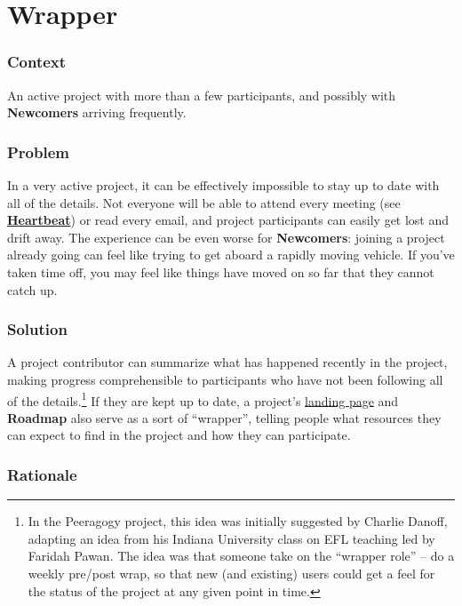 \section{Wrapper}\label{wrapper}

\subsubsection{Context}\label{context}

An active project with more than a few participants, and possibly with
{\textbf{Newcomers}} arriving frequently.

\subsubsection{Problem}\label{problem}

In a very active project, it can be effectively impossible to stay up to
date with all of the details. Not everyone will be able to attend every
meeting (see
{\textbf{\href{http://peeragogy.org/patterns/heartbeat/}{Heartbeat}}})
or read every email, and project participants can easily get lost and
drift away. The experience can be even worse for {\textbf{Newcomers}}:
joining a project already going can feel like trying to get aboard a
rapidly moving vehicle. If you've taken time off, you may feel like
things have moved on so far that they cannot catch up.

\subsubsection{Solution}\label{solution}

A project contributor can summarize what has happened recently in the
project, making progress comprehensible to participants who have not
been following all of the details.\footnote{In the Peeragogy project,
  this idea was initially suggested by Charlie Danoff, adapting an idea
  from his Indiana University class on EFL teaching led by Faridah
  Pawan. The idea was that someone take on the ``wrapper role'' -- do a
  weekly pre/post wrap, so that new (and existing) users could get a
  feel for the status of the project at any given point in time.} If
they are kept up to date, a project's
\href{http://socialmediaclassroom.com/host/peeragogy/}{landing page} and
{\textbf{Roadmap}} also serve as a sort of ``wrapper'', telling people
what resources they can expect to find in the project and how they can
participate.

\subsubsection{Rationale}\label{rationale}

